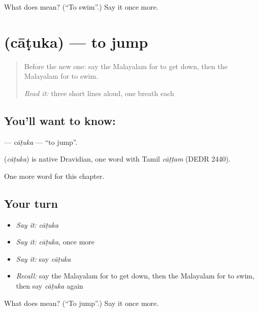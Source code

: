 \begin{tcolorbox}[breakable,colback=teal!4,colframe=teal!35!black,title={Before you move on}]
What does  mean? (\textquotedblleft{}To swim\textquotedblright{}.) Say it once more.
\end{tcolorbox}
\section[\texorpdfstring{\ml{ചാടുക} (cāṭuka)}{ചാടുക (cāṭuka)}]{ (cāṭuka) — to jump}

\label{lesson:ML-C176-catuka}



\begin{quote}
Before the new one: say the Malayalam for to get down, then the Malayalam for to swim.

\emph{Read it:} three short lines aloud, one breath each
\end{quote}

\subsection*{You'll want to know: }
\textbf{} — \emph{cāṭuka} — \textquotedblleft{}to jump\textquotedblright{}.

\begin{cousinweb}
\textbf{} (\emph{cāṭuka}) is native Dravidian, one word with Tamil \emph{cāṭṭam} (DEDR 2440).
\end{cousinweb}

\begin{grammarlens}[title={What you've built}]
One more word for this chapter.
\end{grammarlens}

\subsection*{Your turn}
\begin{itemize}
\raggedright
  \item \emph{Say it:} \emph{cāṭuka}
  \item \emph{Say it:} \emph{cāṭuka}, once more
  \item \emph{Say it:} say \emph{cāṭuka}
  \item \emph{Recall:} say the Malayalam for to get down, then the Malayalam for to swim, then say \emph{cāṭuka} again
\end{itemize}

\begin{tcolorbox}[breakable,colback=teal!4,colframe=teal!35!black,title={Before you move on}]
What does  mean? (\textquotedblleft{}To jump\textquotedblright{}.) Say it once more.
\end{tcolorbox}
